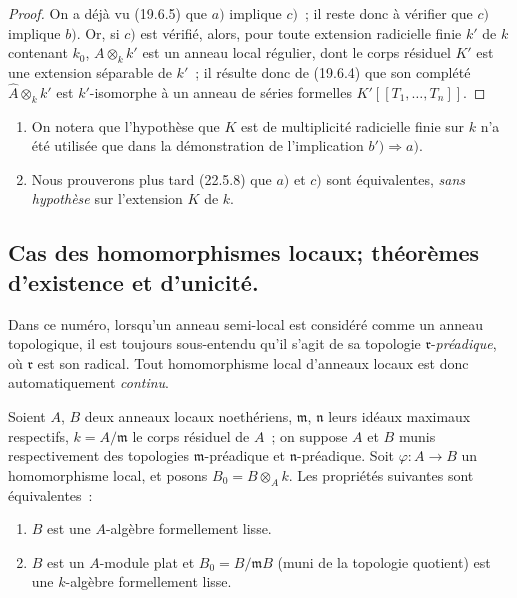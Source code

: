 \begin{proof}
On a déjà vu (19.6.5) que $a)$ implique $c)$~; il reste donc à vérifier que
$c)$ implique $b)$. Or, si $c)$ est vérifié, alors, pour toute extension
radicielle finie $k'$ de $k$ contenant $k_0$, $A\otimes_k k'$ est un anneau
local régulier, dont le corps résiduel $K'$ est une extension séparable de
$k'$~; il résulte donc de (19.6.4) que son complété
$\widehat A\otimes_k k'$ est $k'$-isomorphe à un anneau de séries formelles
$K'[[T_1,\ldots,T_n]]$.
\end{proof}

\begin{remarks}[19.6.7]
\label{0.19.6.7-fr}
\begin{enumerate}
  \item[\rm(i)] On notera que l'hypothèse que $K$ est de multiplicité
  radicielle finie sur $k$ n'a été utilisée que dans la démonstration de
  l'implication $b')\Rightarrow a)$.
  \item[\rm(ii)] Nous prouverons plus tard (22.5.8) que $a)$ et $c)$ sont
  équivalentes, \emph{sans hypothèse} sur l'extension $K$ de $k$.
\end{enumerate}
\end{remarks}

\subsection{Cas des homomorphismes locaux; théorèmes d'existence et
d'unicité.}
\label{subsection:0.19.7-fr}

Dans ce numéro, lorsqu'un anneau semi-local est considéré comme un anneau
topologique, il est toujours sous-entendu qu'il s'agit de sa topologie
$\mathfrak r$-\emph{préadique}, où $\mathfrak r$ est son radical. Tout homomorphisme
local d'anneaux locaux est donc automatiquement \emph{continu}.

\begin{theorem}[19.7.1]
\label{0.19.7.1-fr}
Soient $A$, $B$ deux anneaux locaux noethériens, $\mathfrak m$, $\mathfrak n$
leurs idéaux maximaux respectifs, $k=A/\mathfrak m$ le corps résiduel de $A$~;
on suppose $A$ et $B$ munis respectivement des topologies
$\mathfrak m$-préadique et $\mathfrak n$-préadique. Soit
$\varphi:A\to B$ un homomorphisme local, et posons $B_0=B\otimes_A k$.
Les propriétés suivantes sont équivalentes~:
\begin{enumerate}
  \item[\textup{a)}] $B$ est une $A$-algèbre formellement lisse.


  \item[\textup{b)}] $B$ est un $A$-module plat et
  $B_0=B/\mathfrak mB$ (muni de la topologie quotient) est une $k$-algèbre
  formellement lisse.
\end{enumerate}
\end{theorem}

